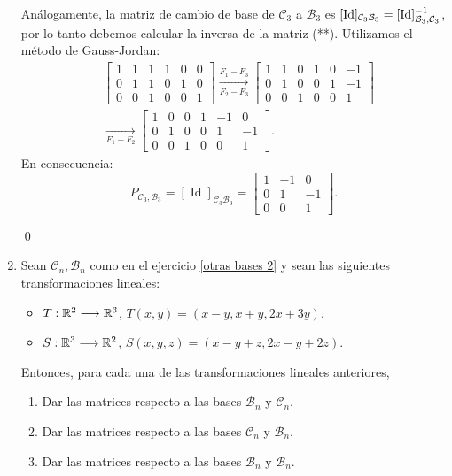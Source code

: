 \begin{enumerate}[topsep=6pt, itemsep=.4cm]
    Análogamente, la matriz de cambio de base  de  $\mathcal C_3$ a $\mathcal B_3$ es $[\operatorname{Id}]_{\mathcal C_3\mathcal B_3} = [\operatorname{Id}]_{{\mathcal{B}_3},{\mathcal{C}_3}}^{-1}$, por lo tanto debemos calcular la inversa de la matriz (**). Utilizamos el método de Gauss-Jordan:
\begin{align*}
    &\left[\begin{array}{ccc|ccc}
    1&1&1&1&0&0\\0&1&1&0&1&0\\0&0&1&0&0&1
    \end{array}\right] \underset{F_2-F_3}{\stackrel{F_1-F_3}{\longrightarrow}} \left[\begin{array}{ccc|ccc}
    1&1&0&1&0&-1\\0&1&0&0&1&-1\\0&0&1&0&0&1
    \end{array}\right] \\
    &\underset{F_1-F_2}{\longrightarrow} \left[\begin{array}{ccc|ccc}
    1&0&0&1&-1&0\\0&1&0&0&1&-1\\0&0&1&0&0&1
    \end{array}\right].
\end{align*}
En  consecuencia:
    \begin{equation*}
        P_{{\mathcal{C}_3},{\mathcal{B}_3}}=  [\operatorname{Id}]_{\mathcal C_3\mathcal B_3} =
        \begin{bmatrix}
        1&-1&0 \\
        0&1&-1\\
        0&0&1\end{bmatrix}. 
    \end{equation*}




\qed
    
\item \label{basesRn} Sean $\mathcal{C}_n, \mathcal{B}_n$ como en el ejercicio \ref{otras bases 2} y sean las siguientes transformaciones lineales:
\begin{itemize}
    \item\label{lineales1-a-2} $T:\mathbb R^2 \longrightarrow \mathbb R^3$, $T(x,y)=(x-y,x+y,2x+3y)$.
    \item\label{lineales1-b-2} $S:\mathbb R^3 \longrightarrow \mathbb R^2$, $S(x,y,z)=(x-y+z,2x-y+2z)$.
\end{itemize}

Entonces, para cada una de las transformaciones lineales anteriores,
\begin{enumerate}
    \item Dar las matrices respecto a las bases $\mathcal{B}_n$ y $\mathcal{C}_n$.
    \item Dar las matrices respecto a las bases $\mathcal{C}_n$ y $\mathcal{B}_n$.
    \item Dar las matrices respecto a las bases $\mathcal{B}_n$ y $\mathcal{B}_n$.
\end{enumerate}


\end{enumerate}
